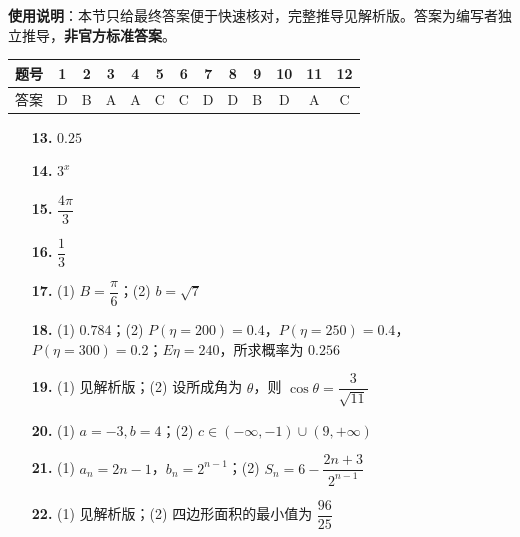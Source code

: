 
\begin{gknotice}
\textbf{使用说明}：本节只给最终答案便于快速核对，完整推导见解析版。答案为编写者独立推导，\textbf{非官方标准答案}。
\end{gknotice}

\begin{center}\begin{tabular}{ccccccccccccc}
\toprule
题号 & 1 & 2 & 3 & 4 & 5 & 6 & 7 & 8 & 9 & 10 & 11 & 12 \\
\midrule
答案 & D & B & A & A & C & C & D & D & B & D & A & C \\
\bottomrule
\end{tabular}\end{center}

\begin{itemize}[leftmargin=2.6em]
  \item[\textbf{13.}] $0.25$
  \item[\textbf{14.}] $3^x$
  \item[\textbf{15.}] $\dfrac{4\pi}{3}$
  \item[\textbf{16.}] $\dfrac13$
\end{itemize}

\begin{itemize}[leftmargin=2.6em]
  \item[\textbf{17.}] (1) $B=\dfrac\pi6$；(2) $b=\sqrt7$
  \item[\textbf{18.}] (1) $0.784$；(2) $P(\eta=200)=0.4$，$P(\eta=250)=0.4$，$P(\eta=300)=0.2$；$E\eta=240$，所求概率为 $0.256$
  \item[\textbf{19.}] (1) 见解析版；(2) 设所成角为 $\theta$，则 $\cos\theta=\dfrac3{\sqrt{11}}$
  \item[\textbf{20.}] (1) $a=-3,b=4$；(2) $c\in(-\infty,-1)\cup(9,+\infty)$
  \item[\textbf{21.}] (1) $a_n=2n-1$，$b_n=2^{n-1}$；(2) $S_n=6-\dfrac{2n+3}{2^{n-1}}$
  \item[\textbf{22.}] (1) 见解析版；(2) 四边形面积的最小值为 $\dfrac{96}{25}$
\end{itemize}
